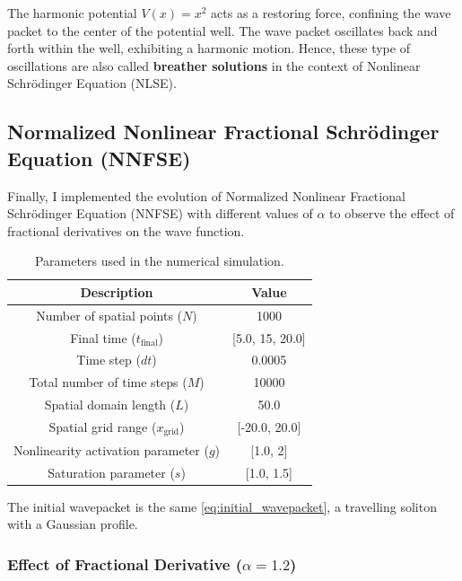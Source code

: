 \documentclass[8pt, a4paper, twocolumn]{article}
\begin{document}
The harmonic potential $V(x) = x^2$ acts as a restoring force, confining the wave packet to the
center of the potential well. The wave packet oscillates back and forth within the well,
exhibiting a harmonic motion. Hence, these type of oscillations
are also called \textbf{breather solutions} in the context of Nonlinear Schrödinger Equation (NLSE).
\subsection{Normalized Nonlinear Fractional Schrödinger Equation (NNFSE)}
Finally, I implemented the evolution of Normalized Nonlinear Fractional Schrödinger Equation (NNFSE) with different 
values of $\alpha$ to observe the effect of fractional derivatives on the wave function. 
\begin{table}[h!]
	\centering
	\begin{tabular}{c|c}
	\toprule
	\textbf{Description} & \textbf{Value}     \\ 
	\midrule
	Number of spatial points ($N$)              & 1000              \\ 
	Final time ($t_{\text{final}}$)             & [5.0, 15, 20.0]   \\ 
	Time step ($dt$)                            & 0.0005            \\ 
	Total number of time steps ($M$)            & 10000             \\ 
	Spatial domain length ($L$)                 & 50.0              \\ 
	Spatial grid range ($x_{\text{grid}}$)      & [-20.0, 20.0]     \\
	Nonlinearity activation parameter ($g$)     & [1.0, 2]          \\
	Saturation parameter ($s$)                  & [1.0, 1.5]        \\
	\bottomrule
	\end{tabular}
	\caption{Parameters used in the numerical simulation.}
\end{table}

The initial wavepacket is the same \ref{eq:initial_wavepacket}, a travelling 
soliton with a Gaussian profile.

\subsubsection{Effect of Fractional Derivative ($\alpha = 1.2$)}
\end{document}
